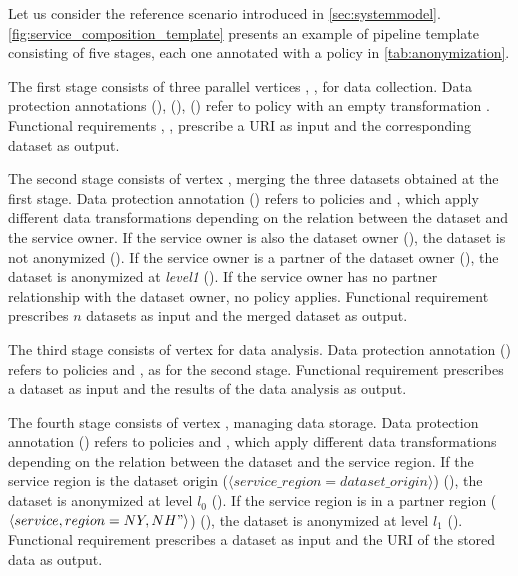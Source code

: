 \begin{example}[\bf \pipelineTemplate]\label{ex:template}
Let us consider the reference scenario introduced in \cref{sec:systemmodel}.
\cref{fig:service_composition_template} presents an example of pipeline template consisting of five stages, each one annotated with a policy in \cref{tab:anonymization}.

The first stage consists of three parallel vertices , ,  for data collection.
Data protection annotations \myLambda(), \myLambda(), \myLambda() refer to policy  with an empty transformation .
Functional requirements , ,   prescribe a URI as input and the corresponding dataset as output.

The second stage consists of vertex , merging the three datasets obtained at the first stage. Data protection annotation \myLambda() refers to policies  and , which apply different data transformations depending on the relation between the dataset and the service owner.
If the service owner is also the dataset owner (\pone), the dataset is not anonymized (). If the service owner is a partner of the dataset owner (\ptwo), the dataset is anonymized at \emph{level1} (). If the service owner has no partner relationship with the dataset owner, no policy applies.
Functional requirement  prescribes $n$ datasets as input and the merged dataset as output.

The third stage consists of vertex   for data analysis.
Data protection annotation \myLambda() refers to policies  and , as for the second stage.
Functional requirement  prescribes a dataset as input and the results of the data analysis as output.


The fourth stage consists of vertex , managing data storage. Data protection annotation \myLambda() refers to policies  and , which apply different data transformations depending on the relation between the dataset and the service region.
If the service region is the dataset origin ($\langle service\_region=dataset\_origin\rangle$) (), the dataset is anonymized at level $l_0$ ().
If the service region is in a partner region ($\langle service,region={NY,NH}"\rangle$) (), the dataset is anonymized at level $l_1$ ().
Functional requirement  prescribes a dataset as input and the URI of the stored data as output.


\end{example}
